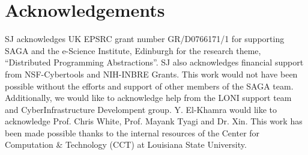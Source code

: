 \documentclass[conference,final]{IEEEtran}
\begin{document}





\section{Acknowledgements}
SJ acknowledges UK EPSRC grant number GR/D0766171/1 for supporting
SAGA and the e-Science Institute, Edinburgh for the research theme,
``Distributed Programming Abstractions''.  SJ also acknowledges
financial support from NSF-Cybertools and NIH-INBRE Grants. This work
would not have been possible without the efforts and support of other
members of the SAGA team.  Additionally, we would like to acknowledge
help from the LONI support team and CyberInfrastructure Develompent
group. Y. El-Khamra would like to acknowledge Prof. Chris White,
Prof. Mayank Tyagi and Dr. Xin. This work has been made possible
thanks to the internal resources of the Center for Computation \&
Technology (CCT) at Louisiana State University.


\end{document}
